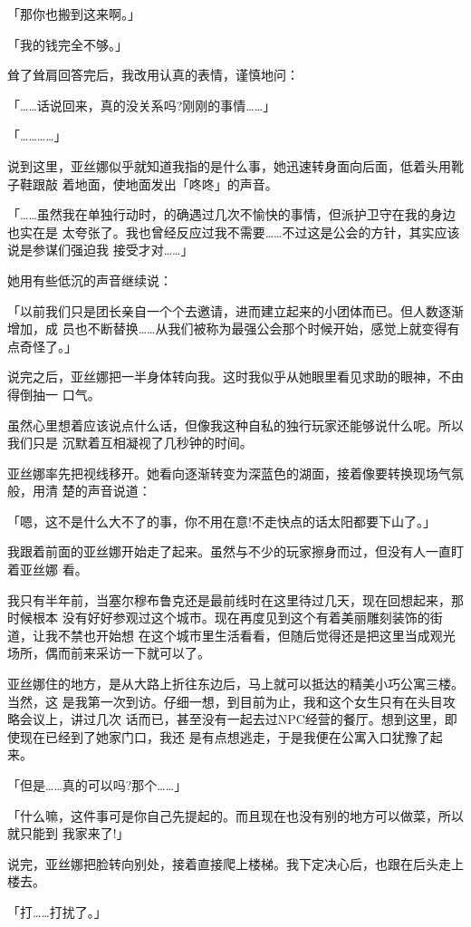 \documentclass[11pt]{book}
\begin{document}
「那你也搬到这来啊。」

「我的钱完全不够。」

耸了耸肩回答完后，我改用认真的表情，谨慎地问：

「……话说回来，真的没关系吗?刚刚的事情……」

「…………」

说到这里，亚丝娜似乎就知道我指的是什么事，她迅速转身面向后面，低着头用靴子鞋跟敲
着地面，使地面发出「咚咚」的声音。

「……虽然我在单独行动时，的确遇过几次不愉快的事情，但派护卫守在我的身边也实在是
太夸张了。我也曾经反应过我不需要……不过这是公会的方针，其实应该说是参谋们强迫我
接受才对……」

她用有些低沉的声音继续说：

「以前我们只是团长亲自一个个去邀请，进而建立起来的小团体而已。但人数逐渐增加，成
员也不断替换……从我们被称为最强公会那个时候开始，感觉上就变得有点奇怪了。」

说完之后，亚丝娜把一半身体转向我。这时我似乎从她眼里看见求助的眼神，不由得倒抽一
口气。

虽然心里想着应该说点什么话，但像我这种自私的独行玩家还能够说什么呢。所以我们只是
沉默着互相凝视了几秒钟的时间。

亚丝娜率先把视线移开。她看向逐渐转变为深蓝色的湖面，接着像要转换现场气氛般，用清
楚的声音说道：

「嗯，这不是什么大不了的事，你不用在意!不走快点的话太阳都要下山了。」

我跟着前面的亚丝娜开始走了起来。虽然与不少的玩家擦身而过，但没有人一直盯着亚丝娜
看。

我只有半年前，当塞尔穆布鲁克还是最前线时在这里待过几天，现在回想起来，那时候根本
没有好好参观过这个城市。现在再度见到这个有着美丽雕刻装饰的街道，让我不禁也开始想
在这个城市里生活看看，但随后觉得还是把这里当成观光场所，偶而前来采访一下就可以了。

亚丝娜住的地方，是从大路上折往东边后，马上就可以抵达的精美小巧公寓三楼。当然，这
是我第一次到访。仔细一想，到目前为止，我和这个女生只有在头目攻略会议上，讲过几次
话而已，甚至没有一起去过NPC经营的餐厅。想到这里，即使现在已经到了她家门口，我还
是有点想逃走，于是我便在公寓入口犹豫了起来。

「但是……真的可以吗?那个……」

「什么嘛，这件事可是你自己先提起的。而且现在也没有别的地方可以做菜，所以就只能到
我家来了!」

说完，亚丝娜把脸转向别处，接着直接爬上楼梯。我下定决心后，也跟在后头走上楼去。

「打……打扰了。」
\end{document}
